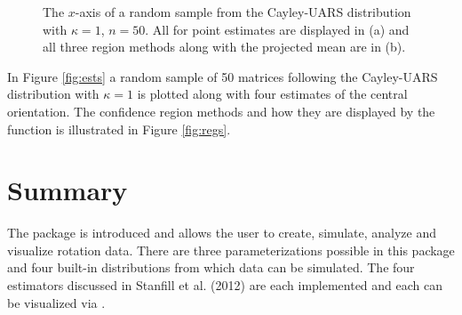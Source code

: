 \begin{figure}[h]
	\caption{\label{figure:eye1}The $x$-axis of a random sample from the Cayley-UARS distribution with $\kappa=1$, $n=50$.  All for point estimates are displayed in (a) and all three region methods along with the projected mean are in (b).}
	
\end{figure}

In Figure \ref{fig:ests} a random sample of 50 matrices following the Cayley-UARS distribution with $\kappa=1$ is plotted along with four estimates of the central orientation.  The confidence region methods and how they are displayed by the  function is illustrated in Figure \ref{fig:regs}.

\section{Summary}

The  package is introduced and allows the user to create, simulate, analyze and visualize rotation data.  There are three parameterizations possible in this package and four built-in distributions from which data can be simulated.  The four estimators discussed in Stanfill et al. (2012) are each implemented and each can be visualized via .




\address{Bryan Stanfill\\
  Department of Statistics\\
  Iowa State University\\
  Ames, IA 50011}\\

\address{Heike Hofmann\\
  Department of Statistics\\
  Iowa State University\\
  Ames, IA 50011}\\

\address{Ulrike Genschel\\
  Department of Statistics\\
  Iowa State University\\
  Ames, IA 50011}\\
